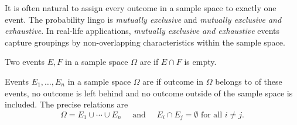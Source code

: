 \documentclass[../main.tex]{subfiles}
\begin{document}
%
%
%
%
%
%
%
%
%
%

It is often natural to assign every outcome in a sample space to exactly one event. The probability lingo is \emph{mutually exclusive} and \emph{mutually exclusive and exhaustive}. In real-life applications, \emph{mutually exclusive and exhaustive} events capture groupings by non-overlapping characteristics within the sample space.

\begin{definition}
  Two events \(E, F\) in a sample space \(\Omega\) are  if \(E \cap F\) is empty. 

  Events \(E_{1}, \ldots, E_{n}\) in a sample space \(\Omega\) are  if  outcome in \(\Omega\) belongs to  of these events, no outcome is left behind and no outcome outside of the sample space is included. The precise relations are
  \[
    \Omega = E_{1} \cup \cdots \cup E_{n} \quad\text{ and }\quad E_{i} \cap E_{j} = \emptyset \text{ for all } i \ne j. 
  \]
\end{definition}
\end{document}
